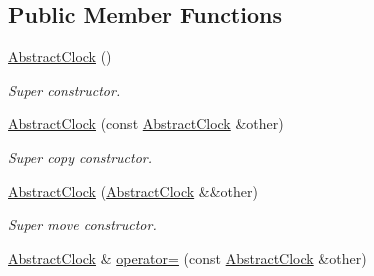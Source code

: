 \subsection*{Public Member Functions}
\begin{DoxyCompactItemize}
\item 
\hypertarget{classomi_1_1runtime_1_1_abstract_clock_a36bf3e030ee8096c0be9c85949dd281d}{}\hyperlink{classomi_1_1runtime_1_1_abstract_clock_a36bf3e030ee8096c0be9c85949dd281d}{Abstract\+Clock} ()\label{classomi_1_1runtime_1_1_abstract_clock_a36bf3e030ee8096c0be9c85949dd281d}

\begin{DoxyCompactList}\small\item\em Super constructor. \end{DoxyCompactList}\item 
\hypertarget{classomi_1_1runtime_1_1_abstract_clock_a7c0ab1571043a7475ed2214ec9aaf33a}{}\hyperlink{classomi_1_1runtime_1_1_abstract_clock_a7c0ab1571043a7475ed2214ec9aaf33a}{Abstract\+Clock} (const \hyperlink{classomi_1_1runtime_1_1_abstract_clock}{Abstract\+Clock} \&other)\label{classomi_1_1runtime_1_1_abstract_clock_a7c0ab1571043a7475ed2214ec9aaf33a}

\begin{DoxyCompactList}\small\item\em Super copy constructor. \end{DoxyCompactList}\item 
\hypertarget{classomi_1_1runtime_1_1_abstract_clock_ae09f0723a287c54fa3afeef09d7f4fba}{}\hyperlink{classomi_1_1runtime_1_1_abstract_clock_ae09f0723a287c54fa3afeef09d7f4fba}{Abstract\+Clock} (\hyperlink{classomi_1_1runtime_1_1_abstract_clock}{Abstract\+Clock} \&\&other)\label{classomi_1_1runtime_1_1_abstract_clock_ae09f0723a287c54fa3afeef09d7f4fba}

\begin{DoxyCompactList}\small\item\em Super move constructor. \end{DoxyCompactList}\item 
\hypertarget{classomi_1_1runtime_1_1_abstract_clock_a04cb4c8a300d2d15eef7bc5be43b45ea}{}\hyperlink{classomi_1_1runtime_1_1_abstract_clock}{Abstract\+Clock} \& \hyperlink{classomi_1_1runtime_1_1_abstract_clock_a04cb4c8a300d2d15eef7bc5be43b45ea}{operator=} (const \hyperlink{classomi_1_1runtime_1_1_abstract_clock}{Abstract\+Clock} \&other)\label{classomi_1_1runtime_1_1_abstract_clock_a04cb4c8a300d2d15eef7bc5be43b45ea}


\end{DoxyCompactItemize}
